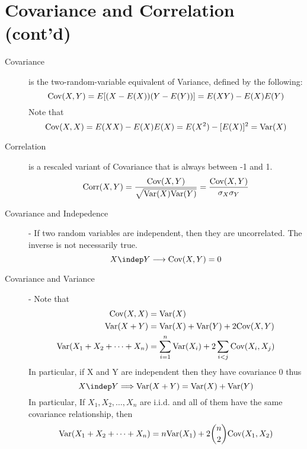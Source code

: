 \documentclass[11pt]{article}
\begin{document}
\section*{Covariance and Correlation (cont'd)}
\begin{description}
\item [Covariance] is the two-random-variable equivalent of Variance, defined by the following:
  \[\textrm{Cov}(X, Y) = E[(X - E(X))(Y - E(Y))] = E(XY) - E(X)E(Y)\]
  Note that
  \[\textrm{Cov}(X, X) = E(XX) - E(X)E(X) =  E(X^2) - [E(X)]^2 = \textrm{Var}(X)\]
\item [Correlation] is a rescaled variant of Covariance that is always between -1 and 1.
  \[\textrm{Corr}(X, Y) = \frac{\textrm{Cov}(X, Y)}{\sqrt{\textrm{Var}(X)\textrm{Var}(Y)}} = \frac{\textrm{Cov}(X, Y)}{\sigma_X\sigma_Y}\]
\item [Covariance and Indepedence] - If two random variables are independent, then they are uncorrelated. The inverse is not necessarily true.
  \[X \indep Y \longrightarrow \cov(X, Y) = 0\]

\item [Covariance and Variance] - Note that
  \begin{align*}
    \textrm{Cov}(X, X) &= \textrm{Var}(X) \\
    \textrm{Var}(X + Y) &= \textrm{Var}(X) + \textrm{Var}(Y) + 2\textrm{Cov}(X, Y) \\
    \textrm{Var}(X_1 + X_2 + \dots + X_n ) &= \sum_{i = 1}^{n}\textrm{Var}(X_i) + 2\sum_{i < j} \textrm{Cov}(X_i, X_j)
  \end{align*}
  In particular, if X and Y are independent then they have covariance 0 thus
  \[X \indep Y \Longrightarrow \var(X + Y) = \var(X) + \var(Y)\]
  In particular, If $X_1, X_2, \dots, X_n$ are i.i.d. and all of them have the same covariance relationship, then
  \[\textrm{Var}(X_1 + X_2 + \dots + X_n ) = n\textrm{Var}(X_1) + 2{n \choose 2}\textrm{Cov}(X_1, X_2)\]


\end{description}
\end{document}
